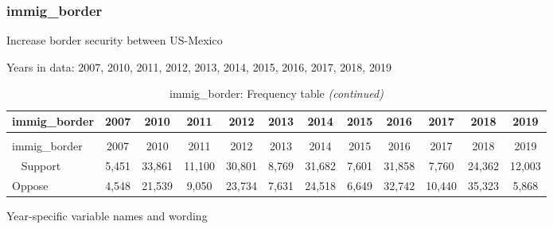 \documentclass[12pt]{article}
\begin{document}
\subsubsection{immig\_border}\label{immig_border}

Increase border security between US-Mexico

Years in data: 2007, 2010, 2011, 2012, 2013, 2014, 2015, 2016, 2017,
2018, 2019

\begin{longtable}[t]{lccccccccccc}
\caption{\label{tab:unnamed-chunk-4}immig\_border: Frequency table}\\
\toprule
immig\_border & 2007 & 2010 & 2011 & 2012 & 2013 & 2014 & 2015 & 2016 & 2017 & 2018 & 2019\\
\midrule
\endfirsthead
\caption[]{immig\_border: Frequency table \textit{(continued)}}\\
\toprule
immig\_border & 2007 & 2010 & 2011 & 2012 & 2013 & 2014 & 2015 & 2016 & 2017 & 2018 & 2019\\
\midrule
\endhead
\
\endfoot
\bottomrule
\endlastfoot
Support & 5,451 & 33,861 & 11,100 & 30,801 & 8,769 & 31,682 & 7,601 & 31,858 & 7,760 & 24,362 & 12,003\\
Oppose & 4,548 & 21,539 & 9,050 & 23,734 & 7,631 & 24,518 & 6,649 & 32,742 & 10,440 & 35,323 & 5,868\\*
\end{longtable}

Year-specific variable names and wording
\end{document}
